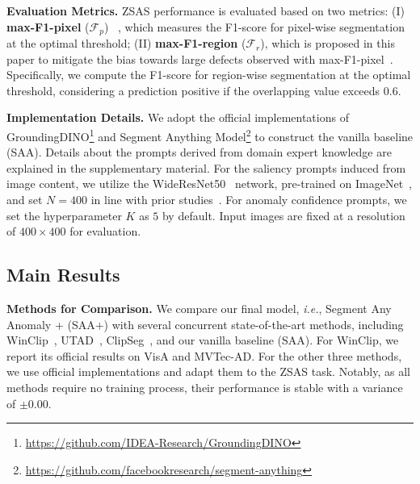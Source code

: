 \documentclass{article}
\begin{document}
\noindent\textbf{Evaluation Metrics.} ZSAS performance is evaluated based on two metrics: 
\noindent (I) \textbf{max-F1-pixel} ($\mathcal{F}_{p}$) ~\cite{jeong2023winclip}, which measures the F1-score for pixel-wise segmentation at the optimal threshold; 
\noindent (II) \textbf{max-F1-region} ($\mathcal{F}_{r}$), which is proposed in this paper to mitigate the bias towards large defects observed with max-F1-pixel~\cite{bergmann2019mvtec}. Specifically, we compute the F1-score for region-wise segmentation at the optimal threshold, considering a prediction positive if the overlapping value exceeds $0.6$.

\vspace{0.05in}

\noindent\textbf{Implementation Details.} We adopt the official implementations of GroundingDINO\footnote{\url{https://github.com/IDEA-Research/GroundingDINO}} and Segment Anything Model\footnote{\url{https://github.com/facebookresearch/segment-anything}} to construct the vanilla baseline (SAA). Details about the prompts derived from domain expert knowledge are explained in the supplementary material. For the saliency prompts induced from image content, we utilize the WideResNet50~\cite{zagoruyko2016wideresnet} network, pre-trained on ImageNet~\cite{hinton2012imagenet}, and set $N=400$ in line with prior studies~\cite{aota2023zero}. For anomaly confidence prompts, we set the hyperparameter $K$ as $5$ by default. Input images are fixed at a resolution of $400 \times 400$ for evaluation.


\subsection{Main Results}
\label{sec:exp_main}

\noindent\textbf{Methods for Comparison.}  We compare our final model, \textit{i.e.}, Segment Any Anomaly + (SAA$+$) with several concurrent state-of-the-art methods, including WinClip~\cite{jeong2023winclip}, UTAD~\cite{aota2023zero}, ClipSeg~\cite{clipseg2022}, and our vanilla baseline (SAA). For WinClip, we report its official results on VisA and MVTec-AD. For the other three methods, we use official implementations and adapt them to the ZSAS task. Notably, as all methods require no training process, their performance is stable with a variance of $\pm0.00$. 
\end{document}
